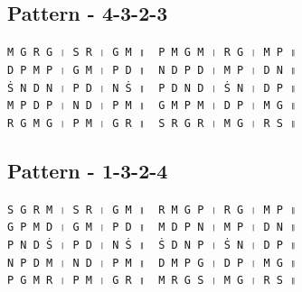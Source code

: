 \documentclass[12pt]{article}
\newcommand{\df}[1]{{\devanagarifont#1}}
\begin{document}
\subsection{Pattern - 4-3-2-3}
\texttt{M~G~R~G~\df{।}~S~R~\df{।}~G~M~\df{॥}~~P~M~G~M~\df{।}~R~G~\df{।}~M~P~\df{॥}}\\
\texttt{D~P~M~P~\df{।}~G~M~\df{।}~P~D~\df{॥}~~N~D~P~D~\df{।}~M~P~\df{।}~D~N~\df{॥}}\\
\texttt{Ṡ~N~D~N~\df{।}~P~D~\df{।}~N~Ṡ~\df{॥}~~P~D~N~D~\df{।}~Ṡ~N~\df{।}~D~P~\df{॥}}\\
\texttt{M~P~D~P~\df{।}~N~D~\df{।}~P~M~\df{॥}~~G~M~P~M~\df{।}~D~P~\df{।}~M~G~\df{॥}}\\
\texttt{R~G~M~G~\df{।}~P~M~\df{।}~G~R~\df{॥}~~S~R~G~R~\df{।}~M~G~\df{।}~R~S~\df{॥}}\\
\subsection{Pattern - 1-3-2-4}
\texttt{S~G~R~M~\df{।}~S~R~\df{।}~G~M~\df{॥}~~R~M~G~P~\df{।}~R~G~\df{।}~M~P~\df{॥}}\\
\texttt{G~P~M~D~\df{।}~G~M~\df{।}~P~D~\df{॥}~~M~D~P~N~\df{।}~M~P~\df{।}~D~N~\df{॥}}\\
\texttt{P~N~D~Ṡ~\df{।}~P~D~\df{।}~N~Ṡ~\df{॥}~~Ṡ~D~N~P~\df{।}~Ṡ~N~\df{।}~D~P~\df{॥}}\\
\texttt{N~P~D~M~\df{।}~N~D~\df{।}~P~M~\df{॥}~~D~M~P~G~\df{।}~D~P~\df{।}~M~G~\df{॥}}\\
\texttt{P~G~M~R~\df{।}~P~M~\df{।}~G~R~\df{॥}~~M~R~G~S~\df{।}~M~G~\df{।}~R~S~\df{॥}}\\
\end{document}
